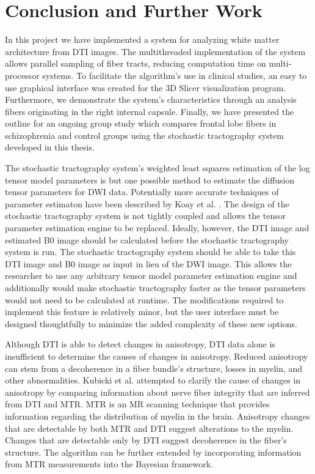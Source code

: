 \chapter{Conclusion and Further Work}
In this project we have implemented a system for analyzing white matter architecture from DTI images.  The multithreaded implementation of the system allows parallel sampling of fiber tracts, reducing computation time on multi-processor systems.  To facilitate the algorithm's use in clinical studies, an easy to use graphical interface was created for the 3D Slicer visualization program. Furthermore, we demonstrate the system's characteristics through an analysis fibers originating in the right internal capsule.  Finally, we have presented the outline for an ongoing group study which compares frontal lobe fibers in schizophrenia and control groups using the stochastic tractography system developed in this thesis.

The stochastic tractography system's weighted least squares estimation of the log tensor model parameters is but one possible method to estimate the diffusion tensor parameters for DWI data.  Potentially more accurate techniques of parameter estimaton have been described by Koay et al. \cite{koay06}.  The design of the stochastic tractography system is not tightly coupled and allows the tensor parameter estimation engine to be replaced.  Ideally, however, the DTI image and estimated B0 image should be calculated before the stochastic tractography system is run.  The stochastic tractography system should be able to take this DTI image and B0 image as input in lieu of the DWI image.  This allows the researcher to use any arbitrary tensor model parameter estimation engine and additionally would make stochastic tractography faster as the tensor parameters would not need to be calculated at runtime.  The modifications required to implement this feature is relatively minor, but the user interface must be designed thoughtfully to minimize the added complexity of these new options.

Although DTI is able to detect changes in anisotropy, DTI data alone is insufficient to determine the causes of changes in anisotropy.  Reduced anisotropy can stem from a decoherence in a fiber bundle's structure, losses in myelin, and other abnormalities.  Kubicki et al. \cite{kubickiNI05} attempted to clarify the cause of changes in anisotropy by comparing information about nerve fiber integrity that are inferred from DTI and MTR.  MTR is an MR scanning technique that provides information regarding the distribution of myelin in the brain. Anisotropy changes that are detectable by both MTR and DTI suggest alterations to the myelin.  Changes that are detectable only by DTI suggest decoherence in the fiber's structure.  The algorithm can be further extended by incorporating information from MTR measurements \cite{kubickiNI05} into the Bayesian framework.


